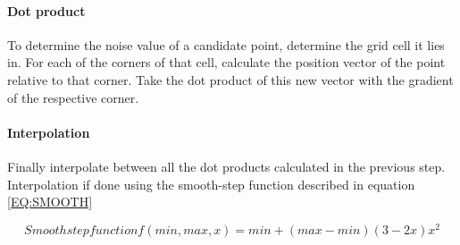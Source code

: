 \paragraph{Dot product}
To determine the noise value of a candidate point,
determine the grid cell it lies in.
For each of the corners of that cell,
calculate the position vector of the point relative to that corner.
Take the dot product of this new vector with the gradient of the respective corner.

\paragraph{Interpolation}
Finally interpolate between all the dot products calculated in the previous step.
Interpolation if done using the smooth-step function described in equation \ref{EQ:SMOOTH}

\begin{equation}[EQ:SMOOTH]{Smoothstep function}
\boxed{f(min, max, x) = min + (max - min)(3 - 2x)x^2}
\end{equation}
